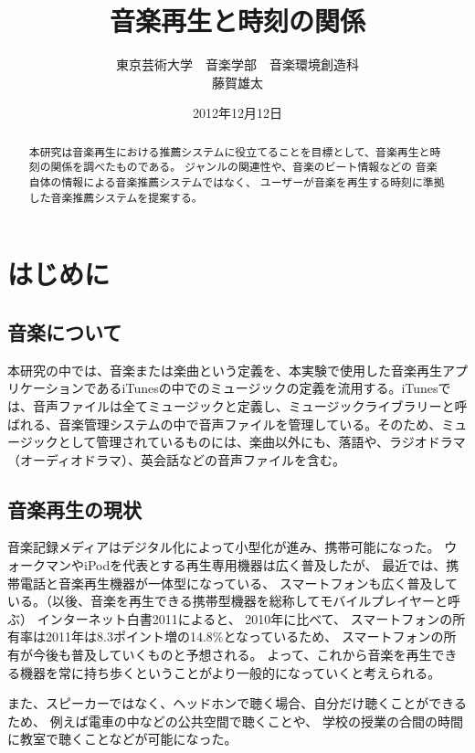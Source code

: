 \documentclass[11pt, onecolumn]{jsarticle}
\begin{document}
\title{音楽再生と時刻の関係}
\author{東京芸術大学　音楽学部　音楽環境創造科　\\藤賀雄太}
\date{2012年12月12日}
\maketitle
\begin{abstract}
本研究は音楽再生における推薦システムに役立てることを目標として、音楽再生と時刻の関係を調べたものである。
ジャンルの関連性や、音楽のビート情報などの
音楽自体の情報による音楽推薦システムではなく、
ユーザーが音楽を再生する時刻に準拠した音楽推薦システムを提案する。
\end{abstract}
\tableofcontents


\section{はじめに}
\subsection{音楽について}
本研究の中では、音楽または楽曲という定義を、本実験で使用した音楽再生アプリケーションであるiTunesの中でのミュージックの定義を流用する。iTunesでは、音声ファイルは全てミュージックと定義し、ミュージックライブラリーと呼ばれる、音楽管理システムの中で音声ファイルを管理している。そのため、ミュージックとして管理されているものには、楽曲以外にも、落語や、ラジオドラマ（オーディオドラマ）、英会話などの音声ファイルを含む。

\subsection{音楽再生の現状}
音楽記録メディアはデジタル化によって小型化が進み、携帯可能になった。
ウォークマンやiPodを代表とする再生専用機器は広く普及したが、
最近では、携帯電話と音楽再生機器が一体型になっている、
スマートフォンも広く普及している。（以後、音楽を再生できる携帯型機器を総称してモバイルプレイヤーと呼ぶ）
インターネット白書2011によると、
2010年に比べて、
スマートフォンの所有率は2011年は8.3ポイント増の14.8\%となっているため、
スマートフォンの所有が今後も普及していくものと予想される。
よって、これから音楽を再生できる機器を常に持ち歩くということがより一般的になっていくと考えられる。

また、スピーカーではなく、ヘッドホンで聴く場合、自分だけ聴くことができるため、
例えば電車の中などの公共空間で聴くことや、
学校の授業の合間の時間に教室で聴くことなどが可能になった。
\end{document}
